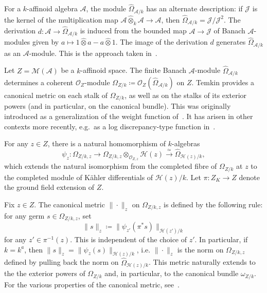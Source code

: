 \documentclass[10pt,reqno]{amsart}
\theoremstyle{plain}
\theoremstyle{definition}
\renewcommand{\H}{\mathcal{H}}
\numberwithin{equation}{section}
\renewcommand{\O}{\mathcal{O}}
\newcommand{\M}{\mathcal{M}}
\newcommand{\hotimes}{\widehat{\otimes}}
\begin{document}
For a $k$-affinoid algebra $\mathcal{A}$, the module $\widehat{\Omega}_{\mathcal{A}/k}$ has an alternate description: if $\mathcal{J}$ is the kernel of the multiplication map $\mathcal{A} \hotimes_k \mathcal{A} \to \mathcal{A}$, then $\widehat{\Omega}_{\mathcal{A}/k} = \mathcal{J}/\mathcal{J}^2$. The derivation $d \colon \mathcal{A} \to \widehat{\Omega}_{\mathcal{A}/k}$ is induced from the bounded map $\mathcal{A} \to \mathcal{J}$ of Banach $\mathcal{A}$-modules given by $a \mapsto 1 \hotimes a - a \hotimes 1$. The image of  the derivation $d$ generates $\widehat{\Omega}_{\mathcal{A}/k}$ as an $\mathcal{A}$-module. This is the approach taken in~\cite[3.3]{berkovich93}.


Let $Z = \M(\mathcal{A})$ be a $k$-affinoid space. The finite Banach $\mathcal{A}$-module $\widehat{\Omega}_{\mathcal{A}/k}$ determines a coherent $\O_Z$-module $\Omega_{Z/k} \coloneqq \O_Z(\widehat{\Omega}_{\mathcal{A}/k})$ on $Z$. Temkin provides a canonical metric on each stalk of $\Omega_{Z/k}$, as well as on the stalks of its exterior powers (and in particular, on the canonical bundle). This was originally introduced as a generalization of the weight function of~\cite{mustata-nicaise}. It has arisen in other contexts more recently, e.g.\ as a log discrepancy-type function in~\cite[5.6]{boucksom-jonsson}. 

For any $z \in Z$, there is a natural homomorphism of $k$-algebras
$$
\psi_z \colon \Omega_{Z/k,z} \longrightarrow \Omega_{Z/k,z} \otimes_{\O_{Z,z}} \H(z) \stackrel{\simeq}{\longrightarrow} \widehat{\Omega}_{\H(z)/k},
$$
which extends the natural isomorphism from the completed fibre of $\Omega_{Z/k}$ at $z$ to the completed module of K\"ahler differentials of $\H(z)/k$. Let $\pi \colon Z_K \to Z$ denote the ground field extension of $Z$. 

Fix $z \in Z$. The canonical metric $\| \cdot \|_z$ on $\Omega_{Z/k,z}$ is defined by the following rule: for any germ $s \in \Omega_{Z/k,z}$, set
$$
\| s \|_z \coloneqq \| \psi_{z'} \left( \pi^* s \right) \|_{\H(z')/k}
$$
for any $z' \in \pi^{-1}(z)$. This is independent of the choice of $z'$. In particular, if $k = k^a$, then $\| s \|_z = \| \psi_z(s) \|_{\H(z)/k}$, i.e. $\| \cdot \|_z$ is the norm on $\Omega_{Z/k,z}$ defined by pulling back the norm on $\widehat{\Omega}_{\H(z)/k}$. This metric naturally extends to the the exterior powers of $\Omega_{Z/k}$ and, in particular, to the canonical bundle $\omega_{Z/k}$. For the various properties of the canonical metric, see~\cite[\S6]{temkin}.
\end{document}
